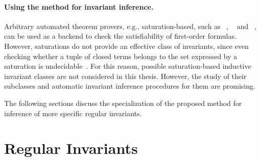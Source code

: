 \paragraph{Using the method for invariant inference.}
Arbitrary automated theorem provers, e.\:g., saturation-based, such as \vampire{}~\cite{kovacs2013first}, \eprover{}~\cite{10.5555/1218615.1218621} and \zipperposition{}~\cite{10.1007/978-3-319-66167-4_10}, can be used as a backend to check the satisfiability of first-order formulas.
However, saturations do not provide an effective class of invariants, since even checking whether a tuple of closed terms belongs to the set expressed by a saturation is undecidable~\cite{4556689}.
For this reason, possible saturation-based inductive invariant classes are not considered in this thesis. However, the study of their subclasses and automatic invariant inference procedures for them are promising.

The following sections discuss the specialization of the proposed method for inference of more specific regular invariants.

\section{Regular Invariants}\label{sec:fmf/regular}

